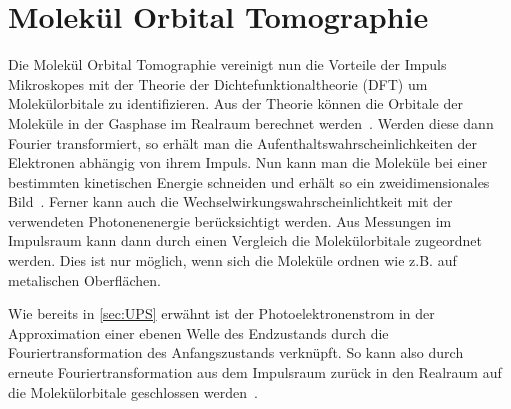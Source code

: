     \section{Molekül Orbital Tomographie} \label{sec:MOT}
        Die Molekül Orbital Tomographie vereinigt nun die Vorteile der Impuls Mikroskopes mit der Theorie der Dichtefunktionaltheorie (DFT) um Molekülorbitale zu identifizieren.
        Aus der Theorie können die Orbitale der Moleküle in der Gasphase im Realraum berechnet werden~\cite{database}.
        Werden diese dann Fourier transformiert, so erhält man die Aufenthaltswahrscheinlichkeiten der Elektronen abhängig von ihrem Impuls.
        Nun kann man die Moleküle bei einer bestimmten kinetischen Energie schneiden und erhält so ein zweidimensionales Bild~\cite{brandstetter_kmappy_2021}.
        Ferner kann auch die Wechselwirkungswahrscheinlichtkeit mit der verwendeten Photonenenergie berücksichtigt werden.
        Aus Messungen im Impulsraum kann dann durch einen Vergleich die Molekülorbitale zugeordnet werden.
        Dies ist nur möglich, wenn sich die Moleküle ordnen wie z.B. auf metalischen Oberflächen.

        Wie bereits in \autoref{sec:UPS} erwähnt ist der Photoelektronenstrom in der Approximation einer ebenen Welle des Endzustands durch die Fouriertransformation des Anfangszustands verknüpft.
        So kann also durch erneute Fouriertransformation aus dem Impulsraum zurück in den Realraum auf die Molekülorbitale geschlossen werden~\cite{MM_2}.

